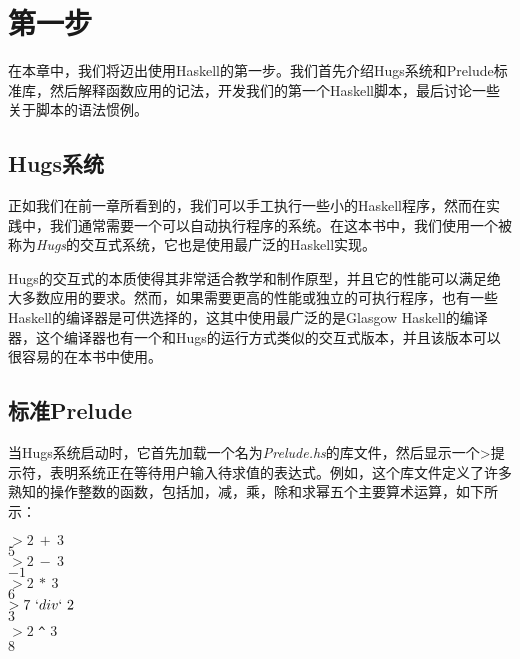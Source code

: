 \chapter{第一步}

在本章中，我们将迈出使用Haskell的第一步。我们首先介绍Hugs系统和Prelude标准库，然后解释函数应用的记法，开发我们的第一个Haskell脚本，最后讨论一些关于脚本的语法惯例。

\section{Hugs系统}
正如我们在前一章所看到的，我们可以手工执行一些小的Haskell程序，然而在实践中，我们通常需要一个可以自动执行程序的系统。在这本书中，我们使用一个被称为\textit{Hugs}的交互式系统，它也是使用最广泛的Haskell实现。

Hugs的交互式的本质使得其非常适合教学和制作原型，并且它的性能可以满足绝大多数应用的要求。然而，如果需要更高的性能或独立的可执行程序，也有一些Haskell的编译器是可供选择的，这其中使用最广泛的是Glasgow
Haskell的编译器，这个编译器也有一个和Hugs的运行方式类似的交互式版本，并且该版本可以很容易的在本书中使用。

\section{标准Prelude}

当Hugs系统启动时，它首先加载一个名为\textit{Prelude.hs}的库文件，然后显示一个>提示符，表明系统正在等待用户输入待求值的表达式。例如，这个库文件定义了许多熟知的操作整数的函数，包括加，减，乘，除和求幂五个主要算术运算，如下所示：

\noindent\hspace*{1cm} $>2~+~3$\\
\hspace*{1cm} $5$\\
\hspace*{1cm} $> 2~-~3$\\
\hspace*{1cm} $-1$\\
\hspace*{1cm} $> 2~*~3$\\
\hspace*{1cm} $6$\\
\hspace*{1cm} $> 7~`div`~2$\\
\hspace*{1cm} $3$\\
\hspace*{1cm} $> 2$ \verb|^| $3$\\
\hspace*{1cm} $8$

